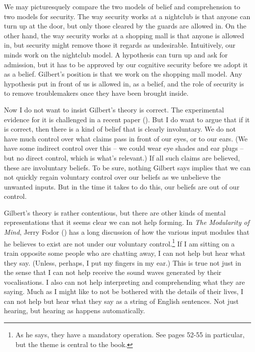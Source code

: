 \documentclass[
  10pt,
  letterpaper,
  DIV=11,
  numbers=noendperiod,
  twoside]{scrartcl}
\begin{document}
We may picturesquely compare the two models of belief and comprehension
to two models for security. The way security works at a nightclub is
that anyone can turn up at the door, but only those cleared by the
guards are allowed in. On the other hand, the way security works at a
shopping mall is that anyone is allowed in, but security might remove
those it regards as undesirable. Intuitively, our minds work on the
nightclub model. A hypothesis can turn up and ask for admission, but it
has to be approved by our cognitive security before we adopt it as a
belief. Gilbert's position is that we work on the shopping mall model.
Any hypothesis put in front of us is allowed in, as a belief, and the
role of security is to remove troublemakers once they have been brought
inside.

Now I do not want to insist Gilbert's theory is correct. The
experimental evidence for it is challenged in a recent paper
(). But I do want to argue that if it is correct, then there is a
kind of belief that is clearly involuntary. We do not have much control
over what claims pass in front of our eyes, or to our ears. (We have
some indirect control over this -- we could wear eye shades and ear
plugs -- but no direct control, which is what's relevant.) If all such
claims are believed, these are involuntary beliefs. To be sure, nothing
Gilbert says implies that we can not quickly regain voluntary control
over our beliefs as we unbelieve the unwanted inputs. But in the time it
takes to do this, our beliefs are out of our control.

Gilbert's theory is rather contentious, but there are other kinds of
mental representations that it seems clear we can not help forming. In
\emph{The Modularity of Mind}, Jerry Fodor
() has a long discussion of how the
various input modules that he believes to exist are not under our
voluntary control.\footnote{As he says, they have a mandatory operation.
  See pages 52-55 in particular, but the theme is central to the book.}
If I am sitting on a train opposite some people who are chatting away, I
can not help but hear what they say. (Unless, perhaps, I put my fingers
in my ear.) This is true not just in the sense that I can not help
receive the sound waves generated by their vocalisations. I also can not
help interpreting and comprehending what they are saying. Much as I
might like to not be bothered with the details of their lives, I can not
help but hear what they say as a string of English sentences. Not just
hearing, but hearing as happens automatically.
\end{document}
